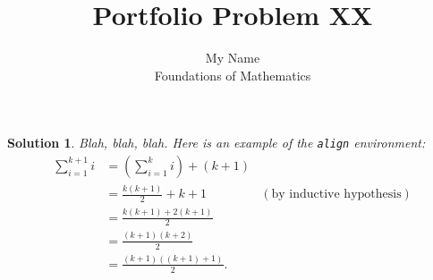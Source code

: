 \documentclass[12pt]{article}
\theoremstyle{mysolutionstyle}
\newtheorem*{soln}{Solution}
\begin{document}

\title{Portfolio Problem XX}%
\author{My Name \\ %
Foundations of Mathematics} %

\maketitle







\begin{soln}
Blah, blah, blah.  Here is an example of the \texttt{align} environment:
\begin{align*}
\sum_{i=1}^{k+1}i & = \left(\sum_{i=1}^{k}i\right) +(k+1)\\
& = \frac{k(k+1)}{2}+k+1 & (\text{by inductive hypothesis})\\
& = \frac{k(k+1)+2(k+1)}{2}\\
& = \frac{(k+1)(k+2)}{2}\\
& = \frac{(k+1)((k+1)+1)}{2}.
\end{align*}
\end{soln}


\end{document}
